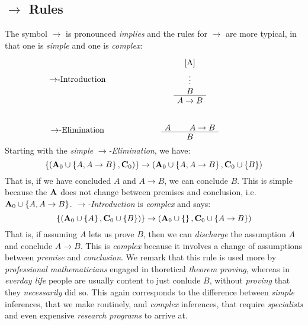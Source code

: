 \documentclass[11pt]{article}
\begin{document}
\subsection*{$\rightarrow$ Rules}
The symbol $\rightarrow$ is pronounced {\em implies} and the rules for $\rightarrow$ are more typical, in that one is {\em simple} and one is {\em complex}:
\begin{equation}
\begin{tabular}{c c}
    $\rightarrow$-Introduction &  
\begin{minipage}{.5\textwidth}
\begin{prooftree}
    \AxiomC{[A]}
    \noLine
    \UnaryInfC{$\vdots$}
    \noLine
    \UnaryInfC{$B$}
    \UnaryInfC{$A \rightarrow B$}
\end{prooftree}
\end{minipage}
    \\
    \vspace{10pt} %
    \\
    $\rightarrow$-Elimination &
\begin{minipage}{.5\textwidth}
\begin{prooftree}
    \AxiomC{$A$}
    \AxiomC{$A \rightarrow B$}
    \BinaryInfC{$B$}
\end{prooftree}
\end{minipage}
\end{tabular}
\end{equation}
Starting with the {\em simple} {\em $\rightarrow$-Elimination}, we have:
\begin{equation}
    \left\{\left({\bf A}_0 \cup \left\{A, A \rightarrow B\right\}, {\bf C}_0\right)\right\} \rightarrow \left({\bf A}_0 \cup \left\{A, A \rightarrow B\right\}, {\bf C}_0 \cup \left\{B\right\}\right)
\end{equation}
That is, if we have concluded $A$ and $A \rightarrow B$, we can conclude $B$.
This is simple because the ${\bf A}$ does not change between premises and conclusion, i.e. ${\bf A}_0 \cup \left\{A, A \rightarrow B\right\}$.
{\em $\rightarrow$-Introduction} is {\em complex} and says:
\begin{equation}
    \left\{\left({\bf A}_0 \cup \left\{A\right\}, {\bf C}_0 \cup \left\{B\right\}\right)\right\} \rightarrow \left({\bf A}_0 \cup \left\{\right\}, {\bf C}_0 \cup \left\{A \rightarrow B\right\}\right)
\end{equation}
That is, if assuming $A$ lets us prove $B$, then we can {\em discharge} the assumption $A$ and conclude $A \rightarrow B$.
This is {\em complex} because it involves a change of assumptions between {\em premise} and {\em conclusion}.
We remark that this rule is used more by {\em professional mathematicians} engaged in thoretical {\em theorem proving}, whereas in {\em everday life} people are usually content to just conlude $B$, without {\em proving} that they {\em necessarily} did so.
This again corresponds to the difference between {\em simple} inferences, that we make routinely, and {\em complex} inferences, that require {\em specialists} and even expensive {\em research programs} to arrive at.
\end{document}

